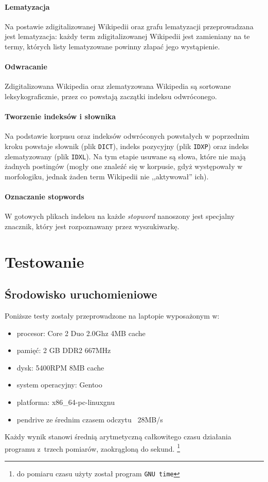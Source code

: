\documentclass[a4paper,12pt]{article}
\begin{document}
\paragraph{Lematyzacja} Na postawie zdigitalizowanej Wikipedii oraz grafu
lematyzacji przeprowadzana jest lematyzacja: każdy term zdigitalizowanej
Wikipedii jest zamieniany na te termy, których listy lematyzowane powinny
złapać jego wystąpienie.

\paragraph{Odwracanie} Zdigitalizowana Wikipedia oraz zlematyzowana Wikipedia
są sortowane leksykograficznie, przez co powstają zaczątki indeksu odwróconego.

\paragraph{Tworzenie indeksów i słownika} Na podstawie korpusu oraz indeksów
odwróconych powstałych w poprzednim kroku powstaje słownik (plik
\texttt{DICT}), indeks pozycyjny (plik \texttt{IDXP}) oraz indeks zlematyzowany
(plik \texttt{IDXL}). Na tym etapie usuwane są słowa, które nie mają żadnych
postingów (mogły one znaleźć się w korpusie, gdyż występowały w morfologiku,
jednak żaden term Wikipedii nie ,,aktywował'' ich).

\paragraph{Oznaczanie stopwords} W gotowych plikach indeksu na każde
\textit{stopword} nanoszony jest specjalny znacznik, który jest rozpoznawany
przez wyszukiwarkę.

\newpage

\section{Testowanie}

\subsection{Środowisko uruchomieniowe}

Poniższe testy zostały przeprowadzone na laptopie wyposażonym w:
\begin{itemize}
	\item procesor: Core 2 Duo 2.0Ghz 4MB cache
	\item pamięć: 2 GB DDR2 667MHz
	\item dysk: 5400RPM 8MB cache
	\item system operacyjny: Gentoo
	\item platforma: x86\_64-pc-linux\dywiz gnu
	\item pendrive ze średnim czasem odczytu ~28MB/s
\end{itemize}
Każdy wynik stanowi średnią arytmetyczną całkowitego czasu działania programu
z~trzech pomiarów, zaokrągloną do sekund.
\footnote{do pomiaru czasu użyty został program \texttt{GNU time}}
\end{document}
